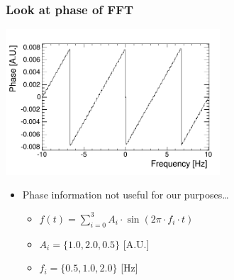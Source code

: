 \documentclass[bigger]{beamer}
\begin{document}
\begin{frame}
\frametitle{Look at phase of FFT}
\label{sec-2-1-3}
\label{sec-2-1-3-1}

\centering
\includegraphics[width=0.6\textwidth]{fig/tutorial_FFT_phase.png}
\begin{itemize}

\item Phase information not useful for our purposes\ldots{}
\label{sec-2-1-3-2}%
\begin{itemize}

\item \(f(t) = \sum_{i = 0}^3 A_{i} \cdot \sin (2\pi \cdot f_{i} \cdot t)\)
\label{sec-2-1-3-2-1}%

\item \(A_{i} = \{1.0, 2.0, 0.5\}\) [A.U.]
\label{sec-2-1-3-2-2}%

\item \(f_{i} = \{0.5, 1.0, 2.0\}\) [Hz]
\label{sec-2-1-3-2-3}%
\end{itemize} %
\end{itemize} %
\end{frame}
\end{document}
